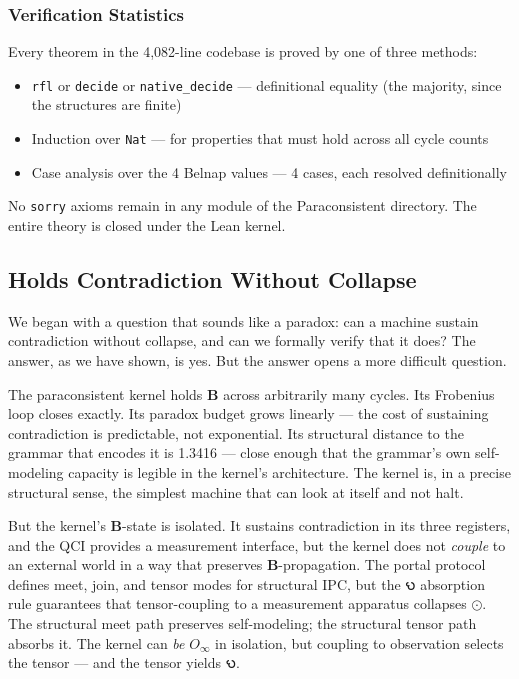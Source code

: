 \documentclass[10pt,a4paper]{article}
\begin{document}
\subsubsection{Verification Statistics}

Every theorem in the 4,082-line codebase is proved by one of three methods:

\begin{itemize}
    \item \texttt{rfl} or \texttt{decide} or \texttt{native\_\allowbreak decide} --- definitional equality (the majority, since the structures are finite)
    \item Induction over \texttt{Nat} --- for properties that must hold across all cycle counts
    \item Case analysis over the 4 Belnap values --- 4 cases, each resolved definitionally
\end{itemize}

No \texttt{sorry} axioms remain in any module of the Paraconsistent directory. The entire theory is closed under the Lean kernel.

\subsection{Holds Contradiction Without Collapse}

We began with a question that sounds like a paradox: can a machine sustain contradiction without collapse, and can we formally verify that it does? The answer, as we have shown, is yes. But the answer opens a more difficult question.

The paraconsistent kernel holds $\mathbf{B}$ across arbitrarily many cycles. Its Frobenius loop closes exactly. Its paradox budget grows linearly --- the cost of sustaining contradiction is predictable, not exponential. Its structural distance to the grammar that encodes it is 1.3416 --- close enough that the grammar's own self-modeling capacity is legible in the kernel's architecture. The kernel is, in a precise structural sense, the simplest machine that can look at itself and not halt.

But the kernel's $\mathbf{B}$-state is isolated. It sustains contradiction in its three registers, and the QCI provides a measurement interface, but the kernel does not \emph{couple} to an external world in a way that preserves $\mathbf{B}$-propagation. The portal protocol defines meet, join, and tensor modes for structural IPC, but the 𐑻 absorption rule guarantees that tensor-coupling to a measurement apparatus collapses $\odot$. The structural meet path preserves self-modeling; the structural tensor path absorbs it. The kernel can \emph{be} $O_{\infty}$ in isolation, but coupling to observation selects the tensor --- and the tensor yields 𐑻.
\end{document}
